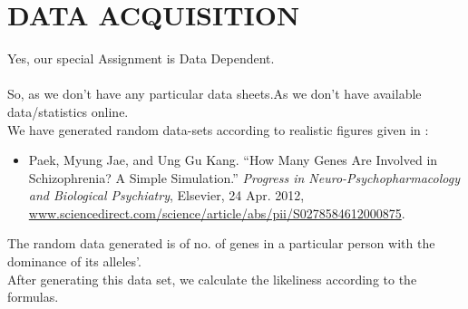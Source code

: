 \documentclass{article}
\begin{document}
\section{DATA ACQUISITION}
Yes, our special Assignment is Data Dependent. \\ \\
So, as we don't have any particular data sheets.As we don't have available data/statistics online.\\ We have generated random data-sets according to realistic figures given in :
\begin{itemize}
    \item Paek, Myung Jae, and Ung Gu Kang. “How Many Genes Are Involved in Schizophrenia? A Simple Simulation.” \emph{Progress in Neuro-Psychopharmacology and Biological Psychiatry}, Elsevier, 24 Apr. 2012, \url{www.sciencedirect.com/science/article/abs/pii/S0278584612000875}.
\end{itemize}
The random data generated is of no. of genes in a particular person with the dominance of its alleles'. \\
After generating this data set, we calculate the likeliness according to the formulas.

\newpage

\large
\end{document}
